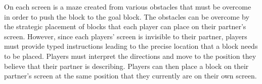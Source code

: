 

On each screen is a maze created from various obstacles that must be
overcome in order to push the block to the goal block. The obstacles
can be overcome by the strategic placement of blocks that each player
can place on their partner's screen. However, since each players'
screen is invisible to their partner, players must provide typed
instructions leading to the precise location that a block needs to be
placed. Players must interpret the directions and move to the position
they believe that their partner is describing. Players can then place
a block on their partner's screen at the same position that they
currently are on their own screen. 

